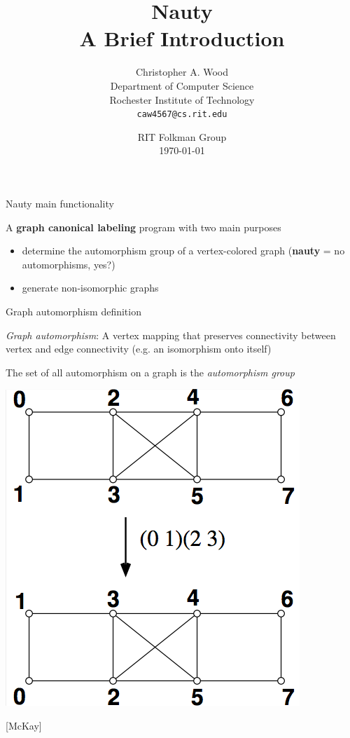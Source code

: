 \documentclass{beamer}
\title
{Nauty \\
A Brief Introduction}
\author[caw rit]
{Christopher A. Wood\\
{\small Department of Computer Science}\\
{\small Rochester Institute of Technology}\\
{\small\tt caw4567@cs.rit.edu}}
\date[CSC 2010] %
{RIT Folkman Group\\ \today}
\begin{document}
\begin{frame}
  \titlepage
\end{frame}


\begin{frame}{Nauty}
{main functionality}

A \textbf{graph canonical labeling} program with two main purposes

\bigskip
\begin{itemize}
\item
determine the automorphism group of a vertex-colored graph (\textbf{nauty} = no automorphisms, yes?)
\item
generate non-isomorphic graphs
\end{itemize}

\end{frame}


\begin{frame}{Graph automorphism}
{definition}

\emph{Graph automorphism}: A vertex mapping that preserves connectivity between vertex and edge
connectivity (e.g. an isomorphism onto itself)

\medskip

The set of all automorphism on a graph is the \emph{automorphism group}

\medskip

\begin{center}
\includegraphics[scale=0.3]{automorphism.png} 
\end{center}
{\small [McKay]}

\end{frame}
\end{document}
